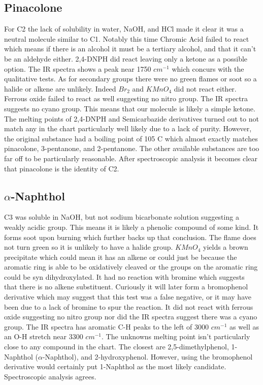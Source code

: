 \documentclass[11pt]{article}
\begin{document}
	\subsection{Pinacolone}
	For C2 the lack of solubility in water, NaOH, and HCl made it clear it was a neutral molecule similar to C1. Notably this time Chromic Acid failed to react which means if there is an alcohol it must be a tertiary alcohol, and that it can't be an aldehyde either. 2,4-DNPH did react leaving only a ketone as a possible option. The IR spectra shows a peak near 1750 $cm^{-1}$ which concurs with the qualitative tests. As for secondary groups there were no green flames or soot so a halide or alkene are unlikely. Indeed $Br_2$ and $KMnO_4$ did not react either. Ferrous oxide failed to react as well suggesting no nitro group. The IR spectra suggests no cyano group. This means that our molecule is likely a simple ketone. The melting points of 2,4-DNPH and Semicarbazide derivatives turned out to not match any in the chart particularly well likely due to a lack of purity. However, the original substance had a boiling point of 105 C which almost exactly matches pinacolone, 3-pentanone, and 2-pentanone. The other available substances are too far off to be particularly reasonable. After spectroscopic analysis it becomes clear that pinacolone is the identity of C2.
	
	\subsection{$\alpha$-Naphthol}
	C3 was soluble in NaOH, but not sodium bicarbonate solution suggesting a weakly acidic group. This means it is likely a phenolic compound of some kind. It forms soot upon burning which further backs up that conclusion. The flame does not turn green so it is unlikely to have a halide group. $KMnO_4$ yields a brown precipitate which could mean it has an alkene or could just be because the aromatic ring is able to be oxidatively cleaved or the groups on the aromatic ring could be syn dihydroxylated. It had no reaction with bromine which suggests that there is no alkene substituent. Curiously it will later form a bromophenol derivative which may suggest that this test was a false negative, or it may have been due to a lack of bromine to spur the reaction. It did not react with ferrous oxide suggesting no nitro group nor did the IR spectra suggest there was a cyano group. The IR spectra has aromatic C-H peaks to the left of 3000 $cm^{-1}$ as well as an O-H stretch near 3300 $cm^{-1}$. The unknowns melting point isn't particularly close to any compound in the chart. The closest are 2,5-dimethylphenol, 1-Naphthol ($\alpha$-Naphthol), and 2-hydroxyphenol. However, using the bromophenol derivative would certainly put 1-Naphthol as the most likely candidate. Spectroscopic analysis agrees.
	
\end{document}
